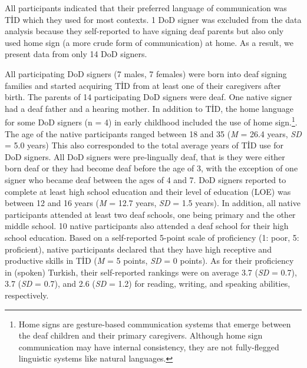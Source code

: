 \documentclass[review]{elsarticle} %
\begin{document}
All participants indicated that their preferred language of
communication was TİD which they used for most contexts. 1 DoD signer
was excluded from the data analysis because they self-reported to have
signing deaf parents but also only used home sign (a more crude form of
communication) at home. As a result, we present data from only 14 DoD
signers.

All participating DoD signers (7 males, 7 females) were born into deaf
signing families and started acquiring TİD from at least one of their
caregivers after birth. The parents of 14 participating DoD signers were
deaf. One native signer had a deaf father and a hearing mother. In
addition to TİD, the home language for some DoD signers (n = 4) in early
childhood included the use of home
sign.\footnote{Home signs are gesture-based communication systems that emerge between the deaf children and their primary caregivers. Although home sign communication may have internal consistency, they are not fully-flegged linguistic systems like natural languages.}.
The age of the native participants ranged between 18 and 35 (\emph{M} =
26.4 years, \emph{SD} = 5.0 years) This also corresponded to the total
average years of TİD use for DoD signers. All DoD signers were
pre-lingually deaf, that is they were either born deaf or they had
become deaf before the age of 3, with the exception of one signer who
became deaf between the ages of 4 and 7. DoD signers reported to
complete at least high school education and their level of education
(LOE) was between 12 and 16 years (\emph{M} = 12.7 years, \emph{SD} =
1.5 years). In addition, all native participants attended at least two
deaf schools, one being primary and the other middle school. 10 native
participants also attended a deaf school for their high school
education. Based on a self-reported 5-point scale of proficiency (1:
poor, 5: proficient), native participants declared that they have high
receptive and productive skills in TİD (\emph{M} = 5 points, \emph{SD} =
0 points). As for their proficiency in (spoken) Turkish, their
self-reported rankings were on average 3.7 (\emph{SD} = 0.7), 3.7
(\emph{SD} = 0.7), and 2.6 (\emph{SD} = 1.2) for reading, writing, and
speaking abilities, respectively.
\end{document}

